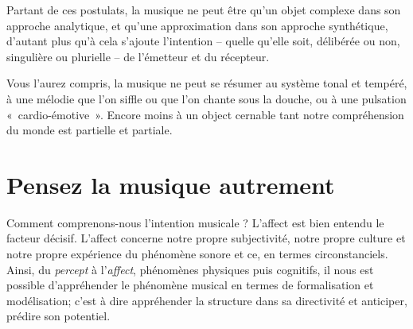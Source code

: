 \documentclass{article}
\begin{document}
\bigskip

Partant de ces postulats, la musique ne peut être qu'un objet complexe dans son approche analytique, et qu'une approximation dans son approche synthétique, d'autant plus qu'à cela s'ajoute l'intention -- quelle qu'elle soit, délibérée ou non, singulière ou plurielle -- de l'émetteur et du récepteur. 

Vous l'aurez compris, la musique ne peut se résumer au système tonal et tempéré, à une mélodie que l'on siffle ou que l'on chante sous la douche, ou à une pulsation \hbox{« cardio-}\hbox{émotive »}. Encore moins à un object cernable tant notre compréhension du monde est partielle et partiale. 

\section*{Pensez la musique autrement}
\label{think}

Comment comprenons-nous l’intention musicale ? L’affect est bien entendu le facteur décisif. L’affect concerne notre propre subjectivité, notre propre culture et notre propre expérience du phénomène sonore et ce, en termes circonstanciels. Ainsi, du \textit{percept} à l'\textit{affect}, phénomènes physiques puis cognitifs, il nous est possible d’appréhender le phénomène musical en termes de formalisation et modélisation; c'est à dire appréhender la structure dans sa directivité et anticiper, prédire son potentiel.  
\end{document}
